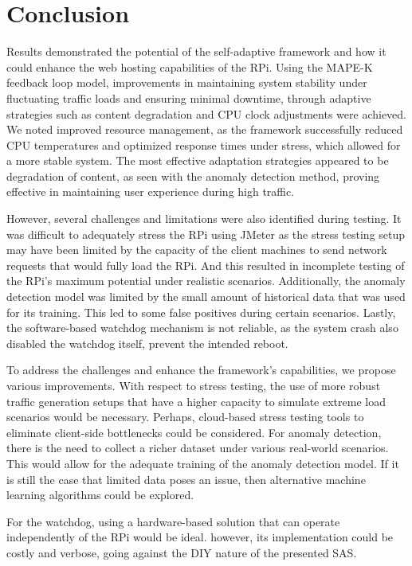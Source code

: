 \documentclass[conference]{IEEEtran}
\begin{document}
\section{\textbf{Conclusion}}\label{conclusion}
Results demonstrated the potential of the self-adaptive framework and how it could enhance the web hosting capabilities of the RPi. Using the MAPE-K feedback loop model, improvements in maintaining system stability under fluctuating traffic loads and ensuring minimal downtime, through adaptive strategies such as content degradation and CPU clock adjustments were achieved. We noted improved resource management, as the framework successfully reduced CPU temperatures and optimized response times under stress, which allowed for a more stable system. The most effective adaptation strategies appeared to be degradation of content, as seen with the anomaly detection method, proving effective in maintaining user experience during high traffic.

However, several challenges and limitations were also identified during testing. It was difficult to adequately stress the RPi using JMeter as the stress testing setup may have been limited by the capacity of the client machines to send network requests that would fully load the RPi. And this resulted in incomplete testing of the RPi's maximum potential under realistic scenarios. Additionally, the anomaly detection model was limited by the small amount of historical data that was used for its training. This led to some false positives during certain scenarios. Lastly, the software-based watchdog mechanism is not reliable, as the system crash also disabled the watchdog itself, prevent the intended reboot.

To address the challenges and enhance the framework's capabilities, we propose various improvements. With respect to stress testing, the use of more robust traffic generation setups that have a higher capacity to simulate extreme load scenarios would be necessary. Perhaps, cloud-based stress testing tools to eliminate client-side bottlenecks could be considered. For anomaly detection, there is the need to collect a richer dataset under various real-world scenarios. This would allow for the adequate training of the anomaly detection model. If it is still the case that limited data poses an issue, then alternative machine learning algorithms could be explored.

For the watchdog, using a hardware-based solution that can operate independently of the RPi would be ideal. however, its implementation could be costly and verbose, going against the DIY nature of the presented SAS.
\end{document}

